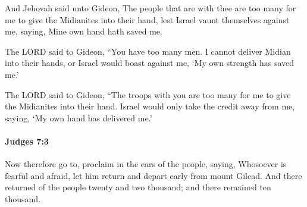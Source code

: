 			\begin{versebox}
					\item[BHS] 
					\item[ASV] And Jehovah said unto Gideon, The people that are with thee are too many for me to give the Midianites into their hand, lest Israel vaunt themselves against me, saying, Mine own hand hath saved me.
					\item[NIV] The LORD said to Gideon, “You have too many men. I cannot deliver Midian into their hands, or Israel would boast against me, ‘My own strength has saved me.’
					\item[NRSV] The LORD said to Gideon, “The troops with you are too many for me to give the Midianites into their hand. Israel would only take the credit away from me, saying, ‘My own hand has delivered me.’
			\end{versebox}

		\paragraph{Judges 7:3} %
			\label{JUDGES-7-3}

			Now therefore go to, proclaim in the ears of the people, saying, Whosoever is fearful and afraid, let him return and depart early from mount Gilead. And there returned of the people twenty and two thousand; and there remained ten thousand.

